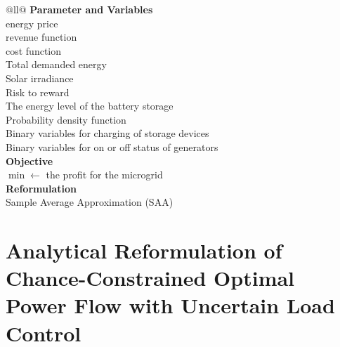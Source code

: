 \documentclass[11pt, oneside, reqno]{amsbook}
\begin{document}
\begin{longtblr}[caption={Summary of Model of \cite{hojjat2024}}]{@{}ll@{}}
  \hline\hline
  { \bfseries Parameter and Variables} \\
  energy price \\
  revenue function \\
  cost function \\
  Total demanded energy \\
  Solar irradiance \\
  Risk to reward \\
  The energy level of the battery storage \\
  Probability density function\\
  Binary variables for charging of storage devices\\
  Binary variables for on or off status of generators \\
  \hline
  { \bfseries Objective} \\
  $\min \leftarrow$ the profit for the microgrid \\
  \hline\hline
  {\bfseries Reformulation} \\
  Sample Average Approximation (SAA)  \\
  \hline\hline
\end{longtblr}


\chapter{Analytical Reformulation of Chance-Constrained Optimal Power Flow with Uncertain Load Control}
\end{document}
